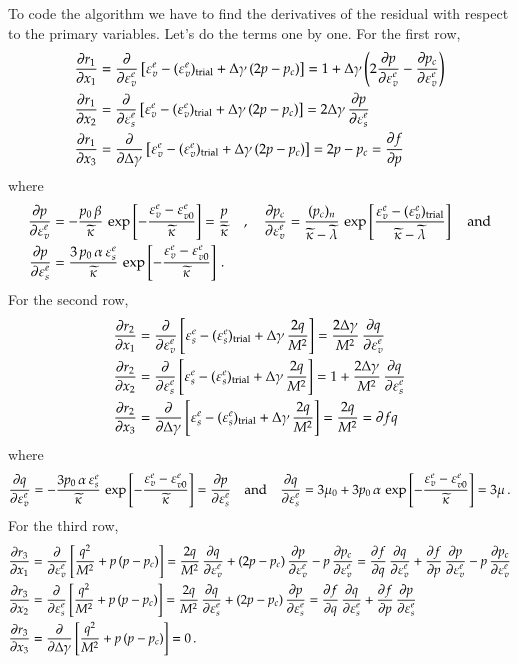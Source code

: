 \documentclass[twoside,10pt,a4paper]{article}
\begin{document}
To code the algorithm we have to find the derivatives of the residual with respect to the primary variables.
Let's do the terms one by one.  For the first row,
\[
  \Bal
  \Partial{r_1}{x_1} & = \Partial{}{\Ve_v^e}\left[\Ve_v^e -  (\Ve_v^e)_\Trial + \Delta\gamma\,(2p-p_c)\right] 
     = 1 + \Delta\gamma\left(2\Partial{p}{\Ve_v^e} - \Partial{p_c}{\Ve_v^e}\right) \\
  \Partial{r_1}{x_2} & = \Partial{}{\Ve_s^e}\left[\Ve_v^e -  (\Ve_v^e)_\Trial + \Delta\gamma\,(2p-p_c)\right] 
     = 2\Delta\gamma\,\Partial{p}{\Ve_s^e}\\
  \Partial{r_1}{x_3} & = \Partial{}{\Delta\gamma}\left[\Ve_v^e -  (\Ve_v^e)_\Trial + \Delta\gamma\,(2p-p_c)\right]
     = 2p - p_c = \Partial{f}{p}
  \Eal
\]
where
\[
  \Bal
   \Partial{p}{\Ve_v^e} & = -\frac{p_0\,\beta}{\kappatilde}\,\exp\left[-\frac{\Ve_v^e - \Ve_{v0}^e}{\kappatilde}\right] = \frac{p}{\kappatilde} \quad, \quad
   \Partial{p_c}{\Ve_v^e} = \frac{(p_c)_n}{\kappatilde-\lambdatilde}\,\exp\left[\frac{\Ve_v^e - (\Ve_{v}^e)_\Trial}{\kappatilde-\lambdatilde}\right] \quad \Tand \\
   \Partial{p}{\Ve_s^e} & = \frac{3\,p_0\,\alpha\,\Ve_s^e}{\kappatilde}\,\exp\left[-\frac{\Ve_v^e - \Ve_{v0}^e}{\kappatilde}\right] \,.
  \Eal
\]
For the second row,
\[
  \Bal
  \Partial{r_2}{x_1} & = \Partial{}{\Ve_v^e}\left[\Ve_s^e -  (\Ve_s^e)_\Trial + \Delta\gamma\,\frac{2q}{M^2}\right] 
     = \frac{2\Delta\gamma}{M^2}\,\Partial{q}{\Ve_v^e} \\
  \Partial{r_2}{x_2} & = \Partial{}{\Ve_s^e}\left[\Ve_s^e -  (\Ve_s^e)_\Trial + \Delta\gamma\,\frac{2q}{M^2}\right] 
     = 1 + \frac{2\Delta\gamma}{M^2}\,\Partial{q}{\Ve_s^e}\\
  \Partial{r_2}{x_3} & = \Partial{}{\Delta\gamma}\left[\Ve_s^e -  (\Ve_s^e)_\Trial + \Delta\gamma\,\frac{2q}{M^2}\right]
     = \frac{2q}{M^2} = \partial{f}{q}
  \Eal
\]
where
\[
  \Partial{q}{\Ve_v^e} = -\frac{3p_0\,\alpha\,\Ve_s^e}{\kappatilde}\,\exp\left[-\frac{\Ve_v^e - \Ve_{v0}^e}{\kappatilde}\right] = \Partial{p}{\Ve_s^e}
  \quad \Tand \quad 
  \Partial{q}{\Ve_s^e} = 3\mu_0 + 3p_0\,\alpha\,\exp\left[-\frac{\Ve_v^e - \Ve_{v0}^e}{\kappatilde}\right] = 3\mu \,.
\]
For the third row, 
\[
  \Bal
  \Partial{r_3}{x_1} & = \Partial{}{\Ve_v^e}\left[\frac{q^2}{M^2} + p\,(p - p_c)\right]
     = \frac{2q}{M^2}\,\Partial{q}{\Ve_v^e} + (2p - p_c)\,\Partial{p}{\Ve_v^e} - p\,\Partial{p_c}{\Ve_v^e} 
     = \Partial{f}{q}\,\Partial{q}{\Ve_v^e} + \Partial{f}{p}\,\Partial{p}{\Ve_v^e} - p\,\Partial{p_c}{\Ve_v^e} \\
  \Partial{r_3}{x_2} & = \Partial{}{\Ve_s^e}\left[\frac{q^2}{M^2} + p\,(p - p_c)\right]
     = \frac{2q}{M^2}\,\Partial{q}{\Ve_s^e} + (2p - p_c)\,\Partial{p}{\Ve_s^e} 
     = \Partial{f}{q}\,\Partial{q}{\Ve_s^e} + \Partial{f}{p}\,\Partial{p}{\Ve_s^e} \\
  \Partial{r_3}{x_3} & = \Partial{}{\Delta\gamma}\left[\frac{q^2}{M^2} + p\,(p - p_c)\right]
     =  0 \,.
  \Eal
\]
\end{document}
